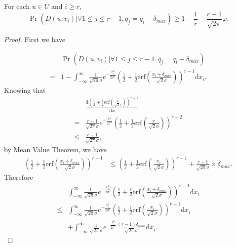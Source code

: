\begin{proposition} \label{proposition2}
    For each $u \in U$ and $i \ge r$,
    $$ \Pr(D(u, v_i) | \forall 1 \le j \le r-1, q_j = q_i - \delta_{max}) \ge 1 - \frac{1}{r} - \frac{r - 1}{\sqrt{2\pi}}\varphi. $$
\end{proposition}

\begin{proof}
    First we have

    \begin{align*}
        &\Pr(D(u, v_i) | \forall 1 \le j \le r-1, q_j = q_i - \delta_{max}) \\
        = &1 - \int_{-\infty}^{\infty} \frac{1}{\sqrt{2 \pi}\sigma} e^{-\frac{x_i^2}{2\sigma^2}}
        (\frac{1}{2} + \frac{1}{2}\mathrm{erf}(\frac{x_i + \delta_{max}}{\sqrt{2}\sigma}))^{r-1} \mathrm{d} x_i.
    \end{align*}
    Knowing that
    \begin{align*}
        & \frac{\mathrm{d} (\frac{1}{2} + \frac{1}{2} \mathrm{erf}(\frac{x}{\sqrt{2}\sigma}))^{r-1}}{\mathrm{d}x}\\
        = &\frac{r - 1}{\sqrt{2\pi}\sigma} e^{-\frac{x^2}{2\sigma^2}} (\frac{1}{2} + \frac{1}{2}\mathrm{erf}(\frac{x}{\sqrt{2}\sigma}))^{r-2} \\
        \le &\frac{r-1}{\sqrt{2\pi}\sigma},
    \end{align*}
    by Mean Value Theorem, we have
    \begin{align*}
        (\frac{1}{2} + \frac{1}{2}\mathrm{erf}(\frac{x_i + \delta_{max}}{\sqrt{2}\sigma}))^{r-1}
        &\le (\frac{1}{2} + \frac{1}{2}\mathrm{erf}(\frac{x_i}{\sqrt{2}\sigma}))^{r-1}
        + \frac{r-1}{\sqrt{2\pi}\sigma} \times \delta_{max}.
    \end{align*}
    Therefore
    \begin{align*}
        & \int_{-\infty}^{\infty} \frac{1}{\sqrt{2 \pi}\sigma} e^{-\frac{x_i^2}{2\sigma^2}}
        (\frac{1}{2} + \frac{1}{2}\mathrm{erf}(\frac{x_i + \delta_{max}}{\sqrt{2}\sigma}))^{r-1} \mathrm{d} x_i \\
        \le &\int_{-\infty}^{\infty} \frac{1}{\sqrt{2 \pi}\sigma} e^{-\frac{x_i^2}{2\sigma^2}}
        (\frac{1}{2} + \frac{1}{2}\mathrm{erf}(\frac{x_i}{\sqrt{2}\sigma}))^{r-1} \mathrm{d} x_i \\
        & + \int_{-\infty}^{\infty} \frac{1}{\sqrt{2 \pi}\sigma} e^{-\frac{x_i^2}{2\sigma^2}}
        \frac{(r-1)\delta_{max}}{\sqrt{2\pi}\sigma}\mathrm{d} x_i.
    \end{align*}


\end{proof}

